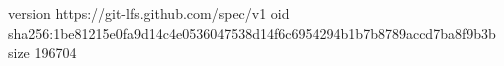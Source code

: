 version https://git-lfs.github.com/spec/v1
oid sha256:1be81215e0fa9d14c4e0536047538d14f6c6954294b1b7b8789accd7ba8f9b3b
size 196704
